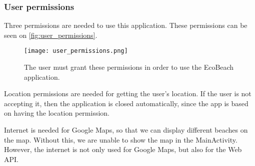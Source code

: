 \subsubsection{User permissions}

Three permissions are needed to use this application. These permissions can be seen on \autoref{fig:user_permissions}.

\begin{figure}[h!]
    \centering
    \texttt{[image: user\_permissions.png]}
    \caption{The user must grant these permissions in order to use the EcoBeach application.}
    \label{fig:user_permissions}
\end{figure}

Location permissions are needed for getting the user’s location. If the user is not accepting it, then the application is closed automatically, since the app is based on having the location permission.

Internet is needed for Google Maps, so that we can display different beaches on the map. Without this, we are unable to show the map in the MainActivity. However, the internet is not only used for Google Maps, but also for the Web API.

